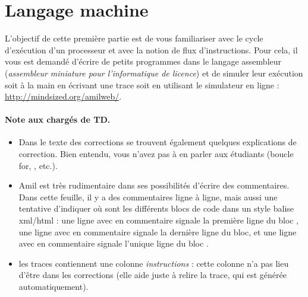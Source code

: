 \section{Langage machine}

L'objectif de cette première partie est de vous familiariser avec le cycle d'exécution
d'un processeur et avec la notion de flux d'instructions. Pour cela,
il vous est demandé d'écrire de petits programmes dans le langage
assembleur  (\emph{assembleur miniature pour l'informatique de
  licence}) et de simuler leur exécution soit à la main en écrivant une trace soit en utilisant le
simulateur en ligne : \url{http://mindsized.org/amilweb/}.

\begin{correction}
 \paragraph{Note aux chargés de TD.}
  \begin{itemize}
  \item Dans le texte des corrections se trouvent également quelques
    explications de correction. Bien entendu, vous n'avez pas à en
    parler aux étudiants (boucle for, , etc.).
  \item Amil est très rudimentaire dans ses possibilités d'écrire des
    commentaires. Dans cette feuille, il y a des commentaires ligne à
    ligne, mais aussi une tentative d'indiquer où sont les différents
    blocs de code dans un style balise xml/html : une ligne avec en
    commentaire  signale la première ligne du bloc
    , une ligne avec en commentaire  signale la
    dernière ligne du bloc, et une ligne avec en commentaire
     signale l'unique ligne du bloc .
  \item les traces contiennent une colonne \emph{instructions} : cette
    colonne n'a pas lieu d'être dans les corrections (elle aide juste
    à relire la trace, qui est générée automatiquement).
  \end{itemize}
\end{correction}

%

